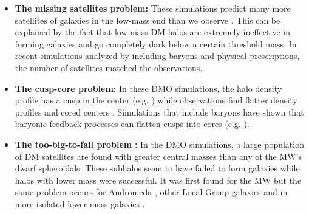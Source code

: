 \begin{itemize}
    \item\textbf{The missing satellites problem:} These simulations predict many more satellites of galaxies in the low-mass end than we observe \citep{Klypin...missingsatellites...1999, Moore...missingsatellites..1999}. This can be explained by the fact that low mass \ac{DM} halos are extremely ineffective in forming galaxies and go completely dark below a certain threshold mass. In recent simulations analyzed by \citet{Sawala...noCDMproblems...2016} including baryons and physical prescriptions, the number of satellites matched the observations.
    \item \textbf{The cusp-core problem:} In these \ac{DMO} simulations, the halo density profile has a cusp in the center (e.g. \citealp{Dunbinski...DMCusp...1991, Navarro...DMCusp...1996}) while observations find flatter density profiles and cored centers \citep{Flores...cuspcoreprob...1994, Moore...cuspcoreprob...1994}. Simulations that include baryons have shown that baryonic feedback processes can flatten cusps into cores (e.g. \citealp{Pontzen...cuspcore..2012}). 
    \item \textbf{The too-big-to-fail problem} \citep{Boylan...toobigtoofail...2011}\textbf{:} In the \ac{DMO} simulations, a large population of \ac{DM} satellites are found with greater central masses than any of the \ac{MW}'s dwarf spheroidals. These subhalos seem to have failed to form galaxies while halos with lower mass were successful. It was first found for the \ac{MW} but the same problem occurs for Andromeda \citep{Tollerud...M31tbtf...2014}, other Local Group galaxies \citep{Kirby...LGtbtf...2014} and in more isolated lower mass galaxies \citep{Ferrero...DGtbtf...2012, Papastergis...DGtbtf...2015, Papastergis...DGtbtf...2016}.

\end{itemize}

